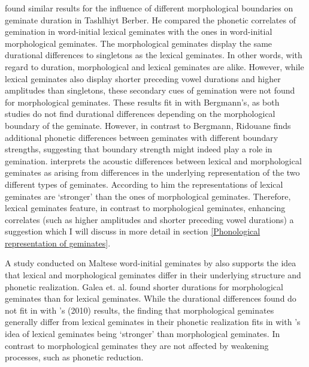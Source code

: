 \cite{Ridouane.2010} found similar results for the influence of different morphological boundaries on geminate duration in Tashlhiyt Berber. He compared the phonetic correlates of gemination in word-initial lexical geminates with the ones in word-initial morphological geminates. The morphological geminates display the same durational differences to singletons as the lexical geminates. In other words, with regard to duration, morphological and lexical geminates are alike. However, while lexical geminates also display shorter preceding vowel durations and higher amplitudes than singletons, these secondary cues of gemination were not found for morphological geminates. These results fit in with Bergmann's, as both studies do not find durational differences depending on the morphological boundary of the geminate. However, in contrast to Bergmann, Ridouane finds additional phonetic differences between geminates with different boundary strengths, suggesting that boundary strength might indeed play a role in gemination. 
\cite{Ridouane.2010} interprets the acoustic differences between lexical and morphological geminates as arising from differences in the underlying representation of the two different types of geminates.  According to him the representations of lexical geminates are ‘stronger' than the ones of morphological geminates. Therefore, lexical geminates feature, in contrast to morphological geminates, enhancing correlates (such as higher amplitudes and shorter preceding vowel durations)  \textendash a suggestion which I will discuss in more detail in section \ref{Phonological representation of geminates}. 

A study conducted on Maltese word-initial geminates by \cite{Galea.2014} also supports the idea that lexical and morphological geminates differ in their underlying structure and phonetic realization. Galea et. al. found shorter durations for morphological geminates than for lexical geminates. While the durational differences found do not fit in with \citeauthor{Ridouane.2010}'s (2010) results, the finding that morphological geminates generally differ from lexical geminates in their phonetic realization fits in with \citeauthor{Ridouane.2010}'s idea of lexical geminates being `stronger' than morphological geminates. In contrast to morphological geminates they are not affected by weakening processes, such as phonetic reduction. 


